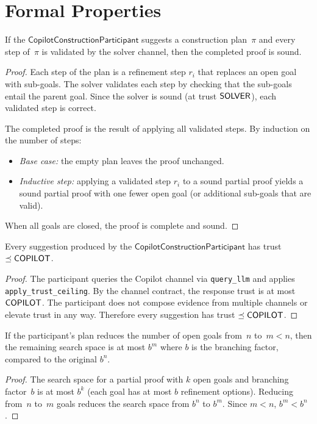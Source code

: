 \documentclass[11pt]{article}
\newcommand{\CCP}{\mathsf{CopilotConstructionParticipant}}
\begin{document}
\section{Formal Properties}\label{sec:formal}

\begin{theorem}\label{thm:consound}
If the $\CCP$ suggests a construction plan~$\pi$ and every
step of~$\pi$ is validated by the solver channel, then the
completed proof is sound.
\end{theorem}
\begin{proof}
Each step of the plan is a refinement step $r_i$ that replaces
an open goal with sub-goals.  The solver validates each step
by checking that the sub-goals entail the parent goal.  Since
the solver is sound (at trust $\mathsf{SOLVER}$), each validated step
is correct.

The completed proof is the result of applying all validated steps.
By induction on the number of steps:
\begin{itemize}
\item \emph{Base case:} the empty plan leaves the proof unchanged.
\item \emph{Inductive step:} applying a validated step $r_i$ to
      a sound partial proof yields a sound partial proof with
      one fewer open goal (or additional sub-goals that are valid).
\end{itemize}
When all goals are closed, the proof is complete and sound.
\end{proof}

\begin{theorem}\label{thm:trustceil}
Every suggestion produced by the $\CCP$ has trust $\preceq \mathsf{COPILOT}$.
\end{theorem}
\begin{proof}
The participant queries the Copilot channel via \texttt{query\_llm}
and applies \texttt{apply\_trust\_ceiling}.  By the channel
contract, the response trust is at most $\mathsf{COPILOT}$.  The
participant does not compose evidence from multiple channels
or elevate trust in any way.  Therefore every suggestion has
trust $\preceq \mathsf{COPILOT}$.
\end{proof}

\begin{theorem}\label{thm:searchred}
If the participant's plan reduces the number of open goals
from~$n$ to~$m < n$, then the remaining search space is
at most $b^m$ where $b$ is the branching factor, compared
to the original $b^n$.
\end{theorem}
\begin{proof}
The search space for a partial proof with $k$ open goals and
branching factor~$b$ is at most $b^k$ (each goal has at most
$b$ refinement options).  Reducing from~$n$ to~$m$ goals
reduces the search space from $b^n$ to $b^m$.  Since $m < n$,
$b^m < b^n$.
\end{proof}
\end{document}
